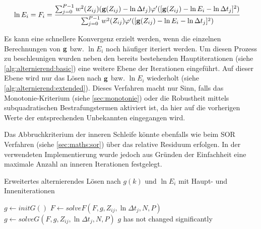 \begin{align}
    \label{eq:f_i:robust}
    \ln E_i = F_i &= \frac{
        \sum_{j=0}^{P-1} 
            w^2(Z_{ij})
            (\mathbf g(Z_{ij})-\ln \Delta t_j)
            \varphi'(
                [\mathbf g(Z_{ij})-\ln E_i - \ln \Delta t_j]^2
            )
    }
    {
        \sum_{j=0}^{P-1} 
            w^2(Z_{ij})
            \varphi'(
                [\mathbf g(Z_{ij})-\ln E_i - \ln \Delta t_j]^2
            )
    }
\end{align}


Es kann eine schnellere Konvergenz erzielt werden, wenn die einzelnen Berechnungen von $\mathbf g$ bzw. $\ln E_i$ noch häufiger iteriert werden. Um diesen Prozess zu beschleunigen wurden neben den bereits bestehenden Hauptiterationen (siehe \autoref{alg:alternierend:basic}) eine weitere Ebene der Iterationen eingeführt. Auf dieser Ebene wird nur das Lösen nach $\mathbf g$ bzw. $\ln E_i$ wiederholt (siehe \autoref{alg:alternierend:extended}). Dieses Verfahren macht nur Sinn, falls das Monotonie-Kriterium (siehe \autoref{sec:monotonie}) oder die Robustheit mittels subquadratischen Bestrafungstermen aktiviert ist, da hier auf die vorherigen Werte der entsprechenden Unbekannten eingegangen wird. 

Das Abbruchkriterium der inneren Schleife könnte ebenfalls wie beim \gls{SOR} Verfahren (siehe \autoref{sec:maths:sor}) über das relative Residuum erfolgen. In der verwendeten Implementierung wurde jedoch aus Gründen der Einfachheit eine maximale Anzahl an inneren Iterationen festgelegt.

\begin{Algorithmus} %
\caption{Erweitertes alternierendes Lösen nach $g(k)$ und $\ln E_i$ mit Haupt- und Inneniterationen}
\label{alg:alternierend:extended}
\begin{algorithmic}
	\State $g \gets initG()$
		\Repeat
		    \State $F \gets solveF(F, g, Z_{ij}, \ln \Delta t_j, N, P)$ 
		\Repeat
			\State $g \gets solveG(F, g, Z_{ij}, \ln \Delta t_j, N, P)$
		\Until$g$ has not changed significantly
	\EndWhile
	\State \Return [$g$, $F$]
\EndFunction
\end{algorithmic}
\end{Algorithmus}






